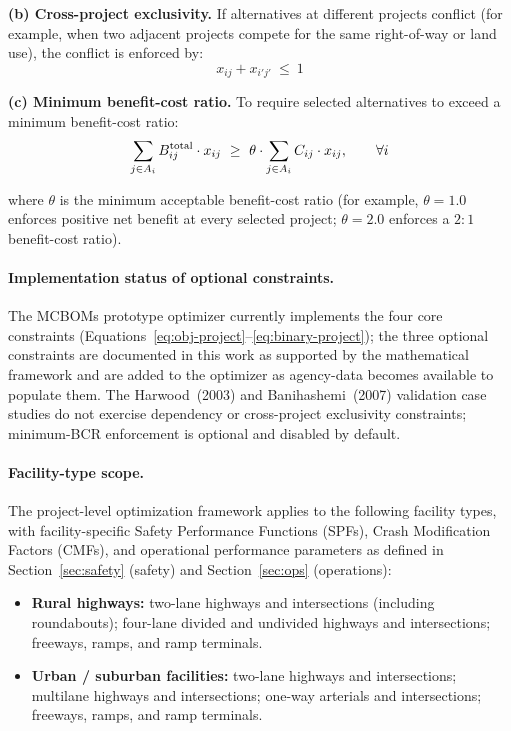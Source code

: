 \textbf{(b) Cross-project exclusivity.} If alternatives at different
projects conflict (for example, when two adjacent projects compete for
the same right-of-way or land use), the conflict is enforced by:
\begin{equation}
x_{ij} + x_{i'j'}\ \leq\ 1
\label{eq:cross-exclusivity}
\end{equation}

\textbf{(c) Minimum benefit-cost ratio.} To require selected alternatives
to exceed a minimum benefit-cost ratio:
\begin{equation}
\sum_{j \in A_i} \Btot_{ij} \cdot x_{ij}\ \geq\ \theta \cdot \sum_{j \in A_i} C_{ij} \cdot x_{ij}, \qquad \forall i
\label{eq:min-bcr}
\end{equation}

\noindent where $\theta$ is the minimum acceptable benefit-cost ratio
(for example, $\theta = 1.0$ enforces positive net benefit at every
selected project; $\theta = 2.0$ enforces a $2{:}1$ benefit-cost ratio).

\paragraph{Implementation status of optional constraints.} The MCBOMs
prototype optimizer currently implements the four core constraints
(Equations~\ref{eq:obj-project}--\ref{eq:binary-project}); the three
optional constraints are documented in this work as supported by the
mathematical framework and are added to the optimizer as agency-data
becomes available to populate them. The Harwood~(2003) and
Banihashemi~(2007) validation case studies do not exercise dependency or
cross-project exclusivity constraints; minimum-BCR enforcement is
optional and disabled by default.

\paragraph{Facility-type scope.} The project-level optimization framework
applies to the following facility types, with facility-specific Safety
Performance Functions (SPFs), Crash Modification Factors (CMFs), and
operational performance parameters as defined in
Section~\ref{sec:safety} (safety) and Section~\ref{sec:ops} (operations):

\begin{itemize}[leftmargin=2em, itemsep=2pt]
  \item \textbf{Rural highways:} two-lane highways and intersections
    (including roundabouts); four-lane divided and undivided highways
    and intersections; freeways, ramps, and ramp terminals.
  \item \textbf{Urban / suburban facilities:} two-lane highways and
    intersections; multilane highways and intersections; one-way
    arterials and intersections; freeways, ramps, and ramp terminals.
\end{itemize}

